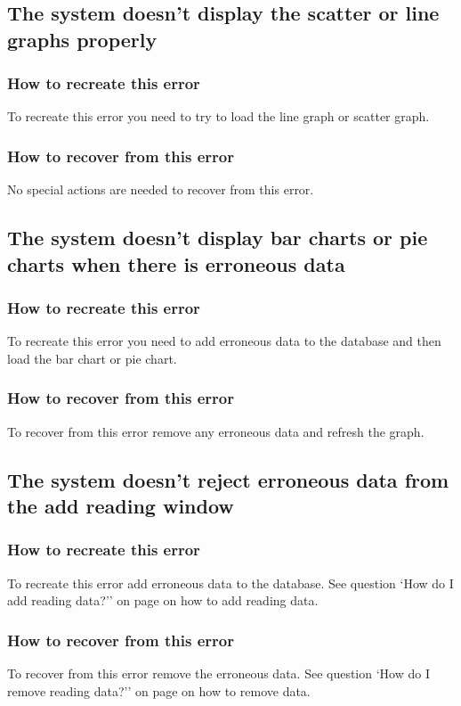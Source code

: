 \subsection{The system doesn't display the scatter or line graphs properly}

\subsubsection{How to recreate this error}
To recreate this error you need to try to load the line graph or scatter graph.

\subsubsection{How to recover from this error}
No special actions are needed to recover from this error.

\subsection{The system doesn't display bar charts or pie charts when there is erroneous data}

\subsubsection{How to recreate this error}
To recreate this error you need to add erroneous data to the database and then load the bar chart or pie chart.

\subsubsection{How to recover from this error}
To recover from this error remove any erroneous data and refresh the graph.

\subsection{The system doesn't reject erroneous data from the add reading window}

\subsubsection{How to recreate this error}
To recreate this error add erroneous data to the database.
See question `How do I add reading data?'' on page \pageref{question:add_reading} on how to add reading data.

\subsubsection{How to recover from this error}
To recover from this error remove the erroneous data.
See question `How do I remove reading data?'' on page \pageref{question:remove_reading} on how to remove data.

